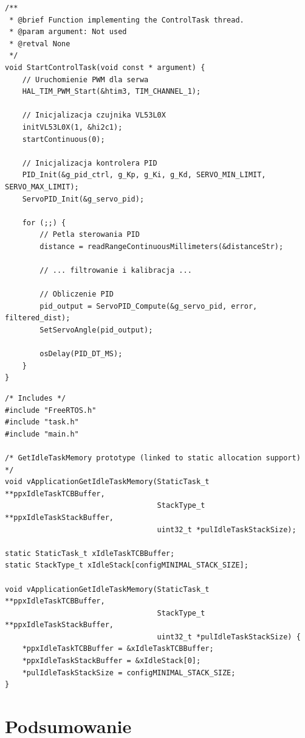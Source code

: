 \documentclass[11pt]{article}
\begin{document}
\begin{lstlisting}[caption={Task sterowania PID (main.c)}, style=cstyle]
/**
 * @brief Function implementing the ControlTask thread.
 * @param argument: Not used
 * @retval None
 */
void StartControlTask(void const * argument) {
    // Uruchomienie PWM dla serwa
    HAL_TIM_PWM_Start(&htim3, TIM_CHANNEL_1);
    
    // Inicjalizacja czujnika VL53L0X
    initVL53L0X(1, &hi2c1);
    startContinuous(0);
    
    // Inicjalizacja kontrolera PID
    PID_Init(&g_pid_ctrl, g_Kp, g_Ki, g_Kd, SERVO_MIN_LIMIT, SERVO_MAX_LIMIT);
    ServoPID_Init(&g_servo_pid);
    
    for (;;) {
        // Petla sterowania PID
        distance = readRangeContinuousMillimeters(&distanceStr);
        
        // ... filtrowanie i kalibracja ...
        
        // Obliczenie PID
        pid_output = ServoPID_Compute(&g_servo_pid, error, filtered_dist);
        SetServoAngle(pid_output);
        
        osDelay(PID_DT_MS);
    }
}
\end{lstlisting}

\begin{lstlisting}[caption={Konfiguracja FreeRTOS (freertos.c)}, style=cstyle]
/* Includes */
#include "FreeRTOS.h"
#include "task.h"
#include "main.h"

/* GetIdleTaskMemory prototype (linked to static allocation support) */
void vApplicationGetIdleTaskMemory(StaticTask_t **ppxIdleTaskTCBBuffer, 
                                   StackType_t **ppxIdleTaskStackBuffer, 
                                   uint32_t *pulIdleTaskStackSize);

static StaticTask_t xIdleTaskTCBBuffer;
static StackType_t xIdleStack[configMINIMAL_STACK_SIZE];

void vApplicationGetIdleTaskMemory(StaticTask_t **ppxIdleTaskTCBBuffer, 
                                   StackType_t **ppxIdleTaskStackBuffer, 
                                   uint32_t *pulIdleTaskStackSize) {
    *ppxIdleTaskTCBBuffer = &xIdleTaskTCBBuffer;
    *ppxIdleTaskStackBuffer = &xIdleStack[0];
    *pulIdleTaskStackSize = configMINIMAL_STACK_SIZE;
}
\end{lstlisting}

\section{Podsumowanie}
\end{document}

